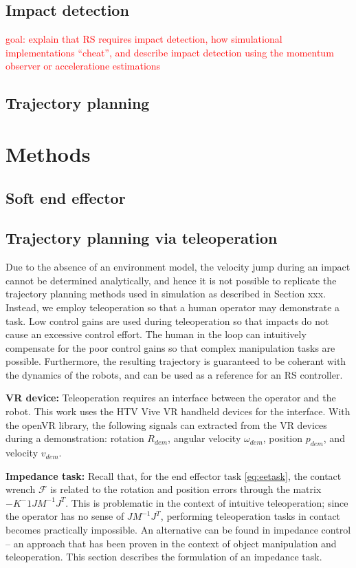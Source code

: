 \documentclass[a4paper, 10pt, conference]{ieeeconf}
\begin{document}
    \subsection{Impact detection}
    \textcolor{red}{goal: explain that RS requires impact detection, how simulational implementations ``cheat'', and describe impact detection using the momentum observer or acceleratione estimations}\\
    \subsection{Trajectory planning}

    \section{Methods}
    \subsection{Soft end effector}

    \subsection{Trajectory planning via teleoperation}
    Due to the absence of an environment model, the velocity jump during an impact cannot be determined analytically, and hence it is not possible to replicate the trajectory planning methods used in simulation as described in Section xxx. Instead, we employ teleoperation so that a human operator may demonstrate a task. Low control gains are used during teleoperation so that impacts do not cause an excessive control effort. The human in the loop can intuitively compensate for the poor control gains so that complex manipulation tasks are possible. Furthermore, the resulting trajectory is guaranteed to be coherant with the dynamics of the robots, and can be used as a reference for an RS controller.

    \textbf{VR device:} Teleoperation requires an interface between the operator and the robot. This work uses the HTV Vive VR handheld devices for the interface. With the openVR library, the following signals can extracted from the VR devices during a demonstration: rotation $R_{dem}$, angular velocity $\omega_{dem}$, position $p_{dem}$, and velocity $v_{dem}$.

    \textbf{Impedance task:} Recall that, for the end effector task \eqref{eq:eetask}, the contact wrench $\mathcal{F}$ is related to the rotation and position errors through the matrix $-K^-1JM^{-1}J^T$. This is problematic in the context of intuitive teleoperation; since the operator has no sense of $JM^{-1}J^T$, performing teleoperation tasks in contact becomes practically impossible. An alternative can be found in impedance control -- an approach that has been proven in the context of object manipulation and teleoperation. This section describes the formulation of an impedance task.
\end{document}
